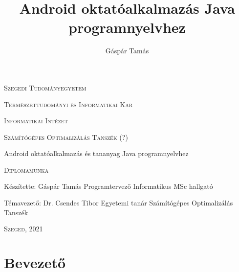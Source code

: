 \documentclass[12pt,a4paper]{article}
\title{Android oktatóalkalmazás Java programnyelvhez}
\author{Gáspár Tamás}
\begin{document}
	
	
	\thispagestyle{empty}
	\centerline{\textsc{\Large{Szegedi Tudományegyetem}}}
	\vspace{0.3 cm}
	\centerline{\textsc{\Large{Természettudományi és Informatikai Kar}}}
	
	\vspace*{2 cm}
	
	\centerline{\textsc{\Large{Informatikai Intézet}}}
	\vspace{0.3 cm}
	\centerline{\textsc{\Large{Számítógépes Optimalizálás Tanszék (?)}}}
	
	\vspace{3 cm}
	
	\centerline{\LARGE{Android oktatóalkalmazás és tananyag Java programnyelvhez}}
	\vspace{0.5 cm}
	\centerline{\Large{\textsc{Diplomamunka}}}
	
	\vspace{3 cm}
	
	\begin{flushleft}
		Készítette: Gáspár Tamás \newline
		Programtervező Informatikus MSc hallgató
	\end{flushleft}

	\vspace{1 cm}

	\begin{flushright}
		\hspace*{\fill} Témavezető: Dr. Csendes Tibor \newline
		\hspace*{\fill} Egyetemi tanár \newline
		\hspace*{\fill} Számítógépes Optimalizálás Tanszék 
	\end{flushright}
	
	\vspace{3 cm}
	
	\centerline{\Large{\textsc{Szeged, 2021}}}
	
	\newpage
	\thispagestyle{empty}
	
	\tableofcontents
	
	\newpage
	\setcounter{page}{1}
	\fontsize{12}{16}\selectfont
	
	\section{Bevezető}
\end{document}

